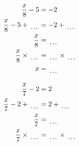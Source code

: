\documentclass[12pt]{article}
\newcounter{minipagecount}
\begin{document}
\begin{multicols}{2}
\begin{minipage}[t]{0.45\textwidth}
    \raggedright %
    \begin{align*} %
        \frac{x}{8} - 5 &= -2\\
        \frac{x}{8} - 5 + \dotuline{\hspace{5mm}} &= -2 + \dotuline{\hspace{5mm}}\\
        \frac{x}{8} &= \dotuline{\hspace{5mm}}\\
        \frac{x}{8} \times\dotuline{\hspace{5mm}} &= \dotuline{\hspace{5mm}} \times\dotuline{\hspace{5mm}}\\
        x &= \dotuline{\hspace{5mm}}\\
    \end{align*}
\end{minipage} %
\noindent{(\theminipagecount)}\hspace{0.1mm} %
\begin{minipage}[t]{0.45\textwidth} %
    \vspace{-26pt}  %
    \raggedright %
    \begin{align*} %
        \frac{x}{7} - 2 &= 2\\
        \frac{x}{7} - 2 + \dotuline{\hspace{5mm}} &= 2 + \dotuline{\hspace{5mm}}\\
        \frac{x}{7} &= \dotuline{\hspace{5mm}}\\
        \frac{x}{7} \times\dotuline{\hspace{5mm}} &= \dotuline{\hspace{5mm}} \times\dotuline{\hspace{5mm}}\\

\end{align*}
\end{minipage}
\end{multicols}
\end{document}
